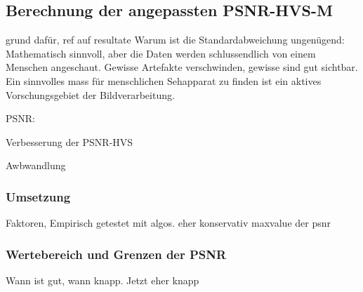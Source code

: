 \subsection{Berechnung der angepassten PSNR-HVS-M}\label{testsetup:psnr}
grund dafür, ref auf resultate
Warum ist die Standardabweichung ungenügend: Mathematisch sinnvoll, aber die Daten werden schlussendlich von einem Menschen angeschaut. Gewisse Artefakte verschwinden, gewisse sind gut sichtbar. Ein sinnvolles mass für menschlichen Sehapparat zu finden ist ein aktives Vorschungsgebiet der Bildverarbeitung.

PSNR:

Verbesserung der PSNR-HVS

Awbwandlung

\subsubsection{Umsetzung}
Faktoren, Empirisch getestet mit algos. eher konservativ
maxvalue der psnr

\subsubsection{Wertebereich und Grenzen der PSNR}
Wann ist gut, wann knapp. Jetzt eher knapp
